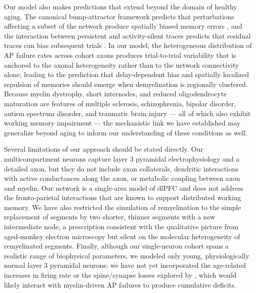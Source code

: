 \documentclass[11pt]{article}
\begin{document}
Our model also makes predictions that extend beyond the domain of healthy aging. The canonical bump-attractor framework predicts that perturbations affecting a subset of the network produce spatially biased memory errors \citep{wimmer2014bump,panichello2019error}, and the interaction between persistent and activity-silent traces predicts that residual traces can bias subsequent trials \citep{mongillo2008synaptic,barbosa2020interplay,wolff2015hidden}. In our model, the heterogeneous distribution of AP failure rates across cohort axons produces trial-to-trial variability that is anchored to the axonal heterogeneity rather than to the network connectivity alone, leading to the prediction that delay-dependent bias and spatially localized repulsion of memories should emerge when demyelination is regionally clustered. Because myelin dystrophy, short internodes, and reduced oligodendrocyte maturation are features of multiple sclerosis, schizophrenia, bipolar disorder, autism spectrum disorder, and traumatic brain injury --- all of which also exhibit working memory impairment --- the mechanistic link we have established may generalize beyond aging to inform our understanding of these conditions as well.

Several limitations of our approach should be stated directly. Our multicompartment neurons capture layer 3 pyramidal electrophysiology and a detailed axon, but they do not include axon collaterals, dendritic interactions with active conductances along the axon, or metabolic coupling between axon and myelin. Our network is a single-area model of dlPFC and does not address the fronto-parietal interactions that are known to support distributed working memory. We have also restricted the simulation of remyelination to the simple replacement of segments by two shorter, thinner segments with a new intermediate node, a prescription consistent with the qualitative picture from aged-monkey electron microscopy \citep{peters2003remyelination,bowley2010cingulate} but silent on the molecular heterogeneity of remyelinated segments. Finally, although our single-neuron cohort spans a realistic range of biophysical parameters, we modeled only young, physiologically normal layer 3 pyramidal neurons; we have not yet incorporated the age-related increases in firing rate or the spine/synapse losses explored by \citet{ibanez2020network}, which would likely interact with myelin-driven AP failures to produce cumulative deficits.
\end{document}
